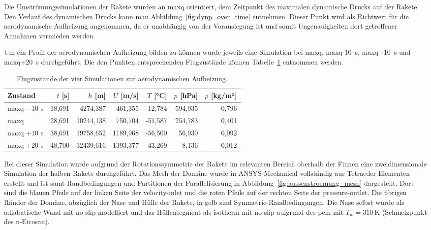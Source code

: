 Die Umströmungssimulationen der Rakete wurden an \ac{maxq} orientiert, dem Zeitpunkt des maximalen dynamische Drucks auf der Rakete.
Den Verlauf des dynamischen Drucks kann man Abbildung~\ref{fig:dynp_over_time} entnehmen.
Dieser Punkt wird als Richtwert für die aerodynamische Aufheizung angenommen, da er unabhängig von der Vorauslegung ist und somit Ungenauigkeiten dort getroffener Annahmen vermieden werden.

Um ein Profil der aerodynamischen Aufheizung bilden zu können wurde jeweils eine Simulation bei \ac{maxq}, \ac{maxq}-\SI{10}{\second},
\ac{maxq}+\SI{10}{\second} und \ac{maxq}+\SI{20}{\second} durchgeführt. Die den Punkten entsprechenden Flugzustände können Tabelle~\ref{tab:simulation_flugzustand} entnommen werden.

\begin{table}[H]
  \centering
  \caption{Flugzustände der vier Simulationen zur aerodynamischen Aufheizung.}\label{tab:simulation_flugzustand}

  \begin{tabular}{lrrrrrr}
    \toprule[1pt]
    Zustand & $t$ [s] & $h$ [m] & $U$ [m/s] & $T$ [°C] & $p$ [hPa] & $\rho$ [kg/m³] \\
    \midrule[0.5pt]
    \ac{maxq} $-10$ s    & 18,691 & 4274,387  & 461,355  & -12,784 & 594,935 & 0,796 \\
    \ac{maxq}            & 28,691 & 10244,138 & 750,704  & -51,587 & 254,783 & 0,401 \\
    \ac{maxq} $+10$ s    & 38,691 & 19758,652 & 1189,968 & -56,500 & 56,930  & 0,092 \\
    \ac{maxq} $+20$ s    & 48,700 & 32439,616 & 1393,377 & -43,269 & 8,136   & 0,012 \\
    \bottomrule[1pt]
  \end{tabular}
\end{table}

Bei dieser Simulation wurde aufgrund der Rotationssymmetrie der Rakete im relevanten Bereich oberhalb der Finnen eine zweidimensionale Simulation der halben Rakete durchgeführt.
Das Mesh der Domäne wurde in ANSYS Mechanical vollständig aus Tetraeder-Elementen erstellt und ist samt Randbedingungen und Partitionen der Parallelisierung in Abbildung~\ref{fig:aussenstroemung_mesh} dargestellt.
Dort sind die blauen Pfeile auf der linken Seite der velocity-inlet und die roten Pfeile auf der rechten Seite der pressure-outlet.
Die übrigen Ränder der Domäne, abzüglich der Nase und Hülle der Rakete, in gelb sind Symmetrie-Randbedingungen.
Die Nase selbst wurde als adiabatische Wand mit no-slip modelliert und das Hüllensegment als isotherm mit no-slip aufgrund des \ac{pcm} mit $T_w = \SI{310}{\kelvin}$ (Schmelzpunkt des n-Eicosan).

